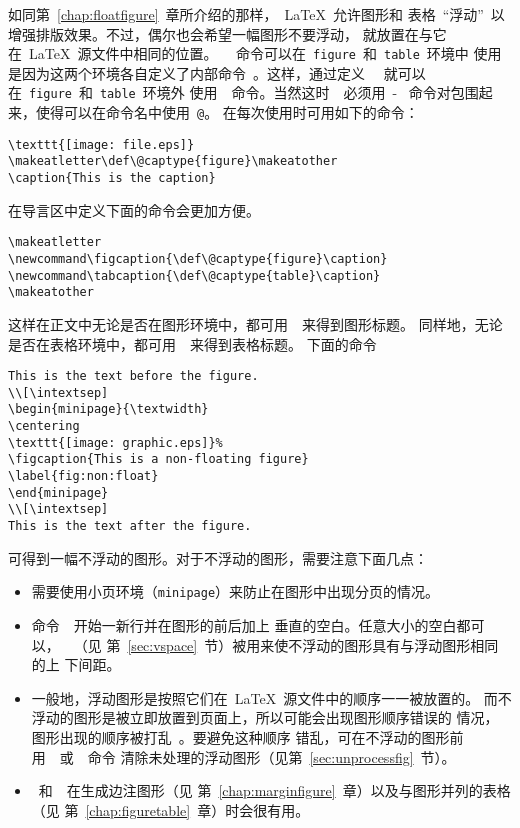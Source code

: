 如同第~\ref{chap:floatfigure}~章所介绍的那样，~\LaTeX{}~允许图形和
表格~``浮动''~以增强排版效果。不过，偶尔也会希望一幅图形不要浮动，
就放置在与它在~\LaTeX{}~源文件中相同的位置。
~~命令可以在~\texttt{figure}~和~\texttt{table}~环境中
使用是因为这两个环境各自定义了内部命令~。这样，通过定义
~~就可以在~\texttt{figure}~和~\texttt{table}~环境外
使用~~命令。当然这时~~必须用~-%
~命令对包围起来，使得可以在命令名中使用~\texttt{@}。
在每次使用时可用如下的命令：
\begin{Verbatim}[xleftmargin=1cm]
\texttt{[image: file.eps]} 
\makeatletter\def\@captype{figure}\makeatother 
\caption{This is the caption}
\end{Verbatim}
在导言区中定义下面的命令会更加方便。
\begin{Verbatim}[xleftmargin=1cm]
\makeatletter 
\newcommand\figcaption{\def\@captype{figure}\caption} 
\newcommand\tabcaption{\def\@captype{table}\caption} 
\makeatother
\end{Verbatim}
这样在正文中无论是否在图形环境中，都可用~~来得到图形标题。
同样地，无论是否在表格环境中，都可用~~来得到表格标题。
下面的命令
\begin{Verbatim}[xleftmargin=1cm]
This is the text before the figure. 
\\[\intextsep] 
\begin{minipage}{\textwidth} 
\centering 
\texttt{[image: graphic.eps]}% 
\figcaption{This is a non-floating figure} 
\label{fig:non:float} 
\end{minipage} 
\\[\intextsep] 
This is the text after the figure.
\end{Verbatim}
可得到一幅不浮动的图形。对于不浮动的图形，需要注意下面几点：
\begin{itemize}
	\item 需要使用小页环境（\texttt{minipage}）来防止在图形中出现分页的情况。
	\item 命令~\cmd{\bs[\bs intextsep]}~开始一新行并在图形的前后加上
	垂直的空白。任意大小的空白都可以，~~（见
	第~\ref{sec:vspace}~节）被用来使不浮动的图形具有与浮动图形相同的上
	下间距。
	\item 一般地，浮动图形是按照它们在~\LaTeX{}~源文件中的顺序一一被放置的。
	而不浮动的图形是被立即放置到页面上，所以可能会出现图形顺序错误的
	情况，图形出现的顺序被打乱~。要避免这种顺序
	错乱，可在不浮动的图形前用~~或~~命令
	清除未处理的浮动图形（见第~\ref{sec:unprocessfig}~节）。
	\item {}~和~~在生成边注图形（见
	第~\ref{chap:marginfigure}~章）以及与图形并列的表格（见
	第~\ref{chap:figuretable}~章）时会很有用。
\end{itemize}

